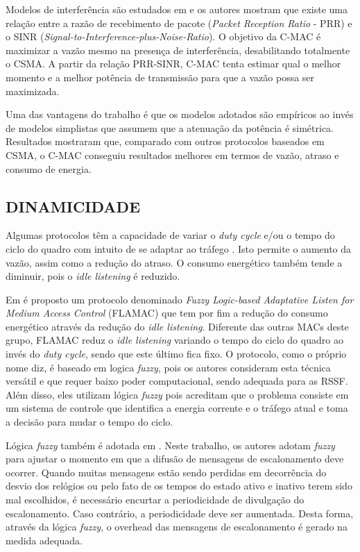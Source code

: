 \documentclass[12pt]{article}
\begin{document}
    Modelos de interferência são estudados em \cite{20094212373426} e os autores mostram que existe uma relação entre a razão de recebimento de pacote (\textit{Packet Reception Ratio} - PRR) e o SINR (\textit{Signal-to-Interference-plus-Noise-Ratio}). O objetivo da C-MAC é maximizar a vazão mesmo na presença de interferência, desabilitando totalmente o CSMA. A partir da relação PRR-SINR, C-MAC tenta estimar qual o melhor momento e a melhor potência de transmissão para que a vazão possa ser maximizada.

    Uma das vantagens do trabalho é que os modelos adotados são empíricos ao invés de modelos simplistas que assumem que a atenuação da potência é simétrica. Resultados mostraram que, comparado com outros protocolos baseados em CSMA, o C-MAC conseguiu resultados melhores em termos de vazão, atraso e consumo de energia.

  \subsection{DINAMICIDADE}
    Algumas protocolos têm a capacidade de variar o \textit{duty cycle} e/ou o tempo do ciclo do quadro com intuito de se adaptar ao tráfego \cite{20064010146973, 20102613044996, Yadav08, 20100512680000, 20093112234782, 20101312811704}. Isto permite o aumento da vazão, assim como a redução do atraso. O consumo energético também tende a diminuir, pois o \textit{idle listening} é reduzido.

    Em \cite {20100812725891} é proposto um protocolo denominado \textit{Fuzzy Logic-based Adaptative Listen for Medium Access Control} (FLAMAC) que tem por fim a redução do consumo energético através da redução do \textit{idle listening}. Diferente das outras MACs deste grupo, FLAMAC reduz o \textit{idle listening} variando o tempo do ciclo do quadro ao invés do \textit{duty cycle}, sendo que este último fica fixo. O protocolo, como o próprio nome diz, é baseado em logica \textit{fuzzy}, pois os autores consideram esta técnica versátil e que requer baixo poder computacional, sendo adequada para as RSSF. Além disso, eles utilizam lógica \textit{fuzzy} pois acreditam que o problema consiste em um sistema de controle que identifica a energia corrente e o tráfego atual e toma a decisão para mudar o tempo do ciclo.

   Lógica \textit{fuzzy} também é adotada em \cite{20101312811704}. Neste trabalho, os autores adotam \textit{fuzzy} para ajustar o momento em que a difusão de mensagens de escalonamento deve ocorrer. Quando muitas mensagens estão sendo perdidas em decorrência do desvio dos relógios ou pelo fato de os tempos do estado ativo e inativo terem sido mal escolhidos, é necessário encurtar a periodicidade de divulgação do escalonamento. Caso contrário, a periodicidade deve ser aumentada. Desta forma, através da lógica \textit{fuzzy}, o overhead das mensagens de escalonamento é gerado na medida adequada.  
\end{document}
